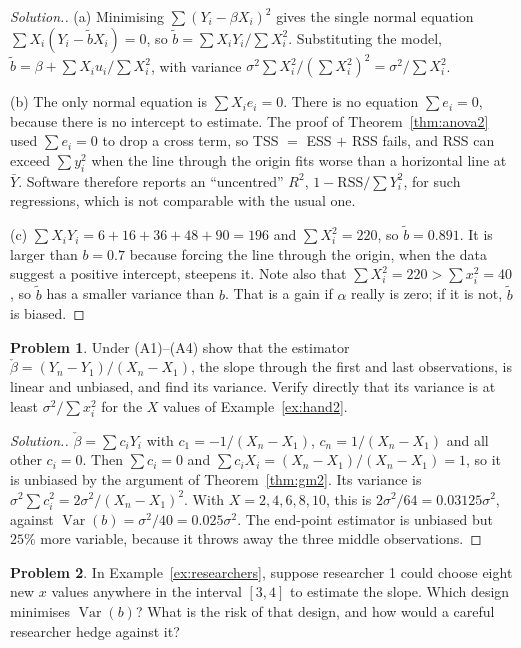 \documentclass[11pt,a4paper]{article}
\numberwithin{equation}{section}
\DeclareMathOperator{\Var}{Var}
\theoremstyle{definition}
\newtheorem{problemx}{Problem}[subsection]
\newenvironment{problem}{\begin{problemx}}{\end{problemx}}
\newenvironment{solution}
  {\renewcommand{\qedsymbol}{}\begin{proof}[\textit{Solution}.]}
  {\end{proof}}
\begin{document}
\begin{solution}
(a) Minimising $\sum (Y_i - \beta X_i)^2$ gives the single normal equation $\sum X_i(Y_i - \tilde bX_i) = 0$, so $\tilde b = \sum X_iY_i/\sum X_i^2$.
Substituting the model, $\tilde b = \beta + \sum X_iu_i/\sum X_i^2$, with variance $\sigma^2\sum X_i^2/(\sum X_i^2)^2 = \sigma^2/\sum X_i^2$.

(b) The only normal equation is $\sum X_ie_i = 0$. There is no equation $\sum e_i = 0$, because there is no intercept to estimate. The proof of
Theorem~\ref{thm:anova2} used $\sum e_i = 0$ to drop a cross term, so TSS $=$ ESS $+$ RSS fails, and RSS can exceed $\sum y_i^2$ when the line
through the origin fits worse than a horizontal line at $\bar Y$. Software therefore reports an ``uncentred'' $R^2$, $1 - \text{RSS}/\sum Y_i^2$,
for such regressions, which is not comparable with the usual one.

(c) $\sum X_iY_i = 6 + 16 + 36 + 48 + 90 = 196$ and $\sum X_i^2 = 220$, so $\tilde b = 0.891$. It is larger than $b = 0.7$ because forcing the line
through the origin, when the data suggest a positive intercept, steepens it. Note also that $\sum X_i^2 = 220 > \sum x_i^2 = 40$, so $\tilde b$ has a
smaller variance than $b$. That is a gain if $\alpha$ really is zero; if it is not, $\tilde b$ is biased.
\end{solution}

\begin{problem}
Under (A1)--(A4) show that the estimator $\check\beta = (Y_n - Y_1)/(X_n - X_1)$, the slope through the first and last observations, is linear and
unbiased, and find its variance. Verify directly that its variance is at least $\sigma^2/\sum x_i^2$ for the $X$ values of Example~\ref{ex:hand2}.
\end{problem}

\begin{solution}
$\check\beta = \sum c_iY_i$ with $c_1 = -1/(X_n - X_1)$, $c_n = 1/(X_n - X_1)$ and all other $c_i = 0$. Then $\sum c_i = 0$ and
$\sum c_iX_i = (X_n - X_1)/(X_n - X_1) = 1$, so it is unbiased by the argument of Theorem~\ref{thm:gm2}. Its variance is
$\sigma^2\sum c_i^2 = 2\sigma^2/(X_n - X_1)^2$. With $X = 2, 4, 6, 8, 10$, this is $2\sigma^2/64 = 0.03125\sigma^2$, against
$\Var(b) = \sigma^2/40 = 0.025\sigma^2$. The end-point estimator is unbiased but $25\%$ more variable, because it throws away the three middle
observations.
\end{solution}

\begin{problem}
In Example~\ref{ex:researchers}, suppose researcher 1 could choose eight new $x$ values anywhere in the interval $[3, 4]$ to estimate the slope.
Which design minimises $\Var(b)$? What is the risk of that design, and how would a careful researcher hedge against it?
\end{problem}
\end{document}
